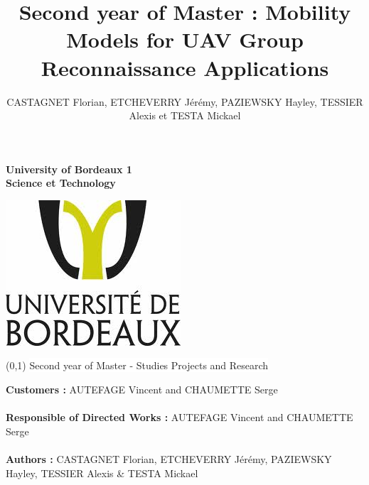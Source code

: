 \documentclass[12pt,a4paper]{article}
\author{CASTAGNET Florian, ETCHEVERRY Jérémy, PAZIEWSKY Hayley, TESSIER Alexis et TESTA Mickael}
\title{Second year of Master : Mobility Models for UAV Group Reconnaissance Applications}
\begin{document}
\thispagestyle{empty}
\setcounter{page}{0}

\begin{minipage}{0.5\linewidth}
\begin{flushleft}
\textbf{University of Bordeaux 1 \\Science et Technology }\\ 
\end{flushleft}
\end{minipage}
\begin{minipage}{0.5\linewidth}
\begin{flushright}
\includegraphics[scale = 0.4]{../images/logo}
\end{flushright}
\end{minipage}

\vspace{4cm}

\begin{center}
\boxput*(0,1){
\colorbox{white}{Second year of Master - Studies Projects and Research}
}
{
\setlength{\fboxsep}{12pt} 
}


\end{center}


\vspace{4cm}


\noindent
\begin{center}

\textbf{Customers :} AUTEFAGE Vincent and CHAUMETTE Serge\\~\\
\textbf{Responsible of Directed Works :} AUTEFAGE Vincent and CHAUMETTE Serge\\~\\
\vspace{4cm}
\textbf{Authors :} CASTAGNET Florian, ETCHEVERRY Jérémy, PAZIEWSKY Hayley, TESSIER Alexis \& TESTA Mickael\\
\end{center}
\newpage
\thispagestyle{empty}
\setcounter{page}{0}
\end{document}
